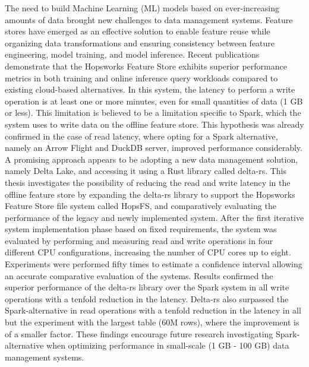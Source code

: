 \begin{scontents}[store-env=abstracts,print-env=true]
The need to build Machine Learning (ML) models based on ever-increasing
amounts of data brought new challenges to data management systems. Feature
stores have emerged as an effective solution to enable feature reuse while
organizing data transformations and ensuring consistency between feature
engineering, model training, and model inference. Recent publications
demonstrate that the Hopsworks Feature Store exhibits superior performance
metrics in both training and online inference query workloads compared to
existing cloud-based alternatives. In this system, the latency to perform a
write operation is at least one or more minutes, even for small
quantities of data (1 GB or less). This limitation is believed to be a limitation specific to Spark, which the system uses to write data on the offline feature store.
This hypothesis was already confirmed in the case of read latency, where
opting for a Spark alternative, namely an Arrow Flight and DuckDB server,
improved performance considerably. A promising approach appears to be
adopting a new data management solution, namely Delta Lake, and accessing
it using a Rust library called delta-rs. This thesis investigates the possibility
of reducing the read and write latency in the offline feature store by expanding
the delta-rs library to support the Hopsworks Feature Store file system called
HopsFS, and comparatively evaluating the performance of the legacy and
newly implemented system. After the first iterative system implementation
phase based on fixed requirements, the system was evaluated by performing
and measuring read and write operations in four different CPU configurations, increasing the number of CPU cores up to eight. Experiments were
performed fifty times to estimate a confidence interval allowing an accurate comparative
evaluation of the systems. Results confirmed the superior performance of the
delta-rs library over the Spark system in all write operations with a tenfold
reduction in the latency. Delta-rs also surpassed the Spark-alternative in read
operations with a tenfold reduction in the latency in all but the experiment
with the largest table (60M rows), where the improvement is of a smaller factor.
These findings encourage future research investigating Spark-alternative when
optimizing performance in small-scale (1 GB - 100 GB) data management
systems.
\end{scontents}
